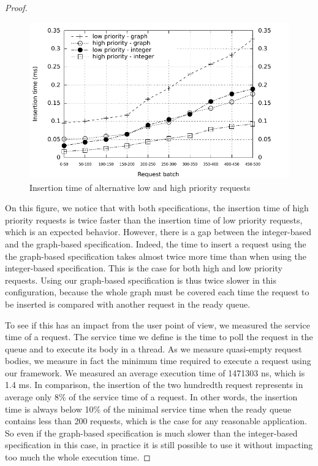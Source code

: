 \documentclass[11pt]{report}
\begin{document}
\begin{proof}
\begin{figure}[!ht]
      \begin{minipage}[c]{\textwidth}
      \centering
      \includegraphics[scale=1]{pictures/alternate.pdf}
      \end{minipage}
      \caption{Insertion time of alternative low and high priority requests}
      \label{fig:alternate} 
\end{figure}

On this figure, we notice that with both specifications, the insertion time of high priority requests is twice faster than the insertion time of low priority requests, which is an expected behavior. However, there is a gap between the integer-based and the graph-based specification. Indeed, the time to insert a request using the the graph-based specification takes almost twice more time than when using the integer-based specification. This is the case for both high and low priority requests. Using our graph-based specification is thus twice slower in this configuration, because the whole graph must be covered each time the request to be inserted is compared with another request in the ready queue. 

To see if this has an impact from the user point of view, we measured the service time of a request. The service time we define is the time to poll the request in the queue and to execute its body in a thread. As we measure quasi-empty request bodies, we measure in fact the minimum time required to execute a request using our framework.
We measured an average execution time of 1471303 ns, which is 1.4 ms. In comparison, the insertion of the two hundredth request represents in average only 8\% of the service time of a request. In other words, the insertion time is always below 10\% of the minimal service time when the ready queue contains less than 200 requests, which is the case for any reasonable application. So even if the graph-based specification is much slower than the integer-based specification in this case, in practice it is still possible to use it without impacting too much the whole execution time.


\end{proof}
\end{document}
